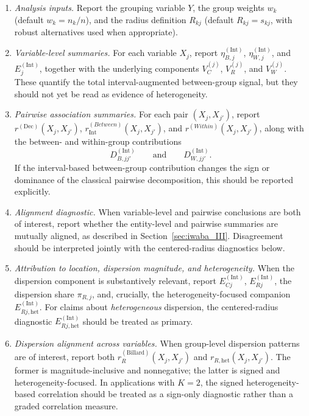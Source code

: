 \documentclass[preprint, times, 12pt, authoryear]{elsarticle}
\begin{document}
\begin{enumerate}[label=(\alph*)]
	\item \emph{Analysis inputs.}
	Report the grouping variable $Y$, the group weights $w_k$ (default $w_k=n_k/n$), and the radius definition $R_{kj}$ (default $R_{kj}=s_{kj}$, with robust alternatives used when appropriate).
	
	\item \emph{Variable-level summaries.}
	For each variable $X_j$, report $\eta_{B,j}^{(\mathrm{Int})}$, $\eta_{W,j}^{(\mathrm{Int})}$, and $E_j^{(\mathrm{Int})}$, together with the underlying components $V_C^{(j)}$, $V_R^{(j)}$, and $V_W^{(j)}$. These quantify the total interval-augmented between-group signal, but they should not yet be read as evidence of heterogeneity.
	
	\item \emph{Pairwise association summaries.}
	For each pair $(X_j,X_{j'})$, report $r^{(\mathrm{Dec})}(X_j,X_{j'})$, $r_{\mathrm{Int}}^{(Between)}(X_j,X_{j'})$, and $r^{(Within)}(X_j,X_{j'})$, along with the between- and within-group contributions
	\[
	D_{B,jj'}^{(\mathrm{Int})}
	\qquad \text{and} \qquad
	D_{W,jj'}^{(\mathrm{Int})}.
	\]
	If the interval-based between-group contribution changes the sign or dominance of the classical pairwise decomposition, this should be reported explicitly.
	
	\item \emph{Alignment diagnostic.}
	When variable-level and pairwise conclusions are both of interest, report whether the entity-level and pairwise summaries are mutually aligned, as described in Section~\ref{sec:iwaba_III}. Disagreement should be interpreted jointly with the centered-radius diagnostics below.
	
	\item \emph{Attribution to location, dispersion magnitude, and heterogeneity.}
	When the dispersion component is substantively relevant, report $E_{Cj}^{(\mathrm{Int})}$, $E_{Rj}^{(\mathrm{Int})}$, the dispersion share $\pi_{R,j}$, and, crucially, the heterogeneity-focused companion $E_{Rj,\mathrm{het}}^{(\mathrm{Int})}$. For claims about \emph{heterogeneous} dispersion, the centered-radius diagnostic $E_{Rj,\mathrm{het}}^{(\mathrm{Int})}$ should be treated as primary.
	
	\item \emph{Dispersion alignment across variables.}
	When group-level dispersion patterns are of interest, report both $r_{R}^{(\mathrm{Billard})}(X_j,X_{j'})$ and $r_{R,\mathrm{het}}(X_j,X_{j'})$. The former is magnitude-inclusive and nonnegative; the latter is signed and heterogeneity-focused. In applications with $K=2$, the signed heterogeneity-based correlation should be treated as a sign-only diagnostic rather than a graded correlation measure.
	

\end{enumerate}
\end{document}
